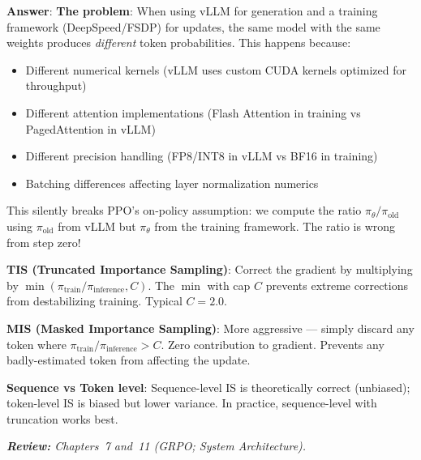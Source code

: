 \begin{questionbox}
\textbf{Answer}: \textbf{The problem}: When using vLLM for generation and a training framework (DeepSpeed/FSDP) for updates, the same model with the same weights produces \emph{different} token probabilities. This happens because:

\begin{itemize}
  \item Different numerical kernels (vLLM uses custom CUDA kernels optimized for throughput)
  \item Different attention implementations (Flash Attention in training vs PagedAttention in vLLM)
  \item Different precision handling (FP8/INT8 in vLLM vs BF16 in training)
  \item Batching differences affecting layer normalization numerics
\end{itemize}

This silently breaks PPO’s on-policy assumption: we compute the ratio $\pi_\theta/\pi_\text{old}$ using $\pi_\text{old}$ from vLLM but $\pi_\theta$ from the training framework. The ratio is wrong from step zero!

\textbf{TIS (Truncated Importance Sampling)}: Correct the gradient by multiplying by $\min(\pi_\text{train}/\pi_\text{inference}, C)$. The $\min$ with cap $C$ prevents extreme corrections from destabilizing training. Typical $C=2.0$.

\textbf{MIS (Masked Importance Sampling)}: More aggressive --- simply discard any token where $\pi_\text{train}/\pi_\text{inference} > C$. Zero contribution to gradient. Prevents any badly-estimated token from affecting the update.

\textbf{Sequence vs Token level}: Sequence-level IS is theoretically correct (unbiased); token-level IS is biased but lower variance. In practice, sequence-level with truncation works best.

\emph{\textbf{Review:} Chapters~7 and~11 (GRPO; System Architecture).}
\end{questionbox}

